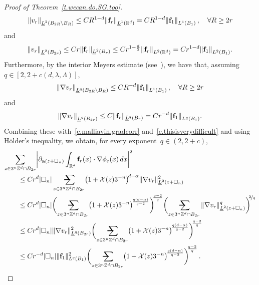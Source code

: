 \documentclass[11pt,twoside]{article} %
\makeatletter
\let\oldsquare\square %
\renewcommand{\square}{\oldsquare}
\numberwithin{equation}{section}
\theoremstyle{definition}
\let\originalleft\left
\let\originalright\right
\renewcommand{\left}{\mathopen{}\mathclose\bgroup\originalleft}
\renewcommand{\right}{\aftergroup\egroup\originalright}
\newcommand*{\Zd}{\ensuremath{\mathbb{Z}^d}}
\newcommand*{\Rd}{\ensuremath{\mathbb{R}^d}}
\newcommand{\f}{\mathbf{f}}
\renewcommand{\a}{\mathbf{a}}
\newcommand{\cu}{\square}
\newcommand{\X}{\mathcal{X}}
\newcommand{\avsum}{\mathop{\mathpalette\avsuminner\relax}\displaylimits}
\newcommand\avsuminner[2]{%
  {\sbox0{$\m@th#1\sum$}%
   \vphantom{\usebox0}%
   \ooalign{%
     \hidewidth
     \smash{\,\rule[.23em]{8.8pt}{1.1pt} \relax}%
     \hidewidth\cr
   ~$\m@th#1\sum$\cr
   }%
  }%
}
\makeatother
\begin{document}
\begin{proof}[{Proof of Theorem~\ref{t.wecan.do.SG.too}}]
\begin{equation*}
\left\| v_r \right\|_{\underline{L}^2(B_{2R}\setminus B_R )}
\leq 
CR^{1-d} \left\| \f_r \right\|_{\underline{L}^1(\Rd)} 
=
CR^{1-d} \left\| \f_1 \right\|_{L^1(B_1)} \,,
\quad \forall R\geq 2r
\end{equation*}
and
\begin{equation*}
\left\| v_r \right\|_{\underline{L}^2(B_{2r})}
\leq 
Cr  \| \f_r \|_{\underline{L}^2(B_r)}
\leq
Cr^{1-\frac d2}  \left\| \f_r \right\|_{L^2(\Rd)}
=
Cr^{1-d} \left\| \f_1 \right\|_{L^2(B_1)} .
\end{equation*}
Furthermore, by the interior Meyers estimate (see~\cite[Theorem C.1]{AKMBook}), we have that, assuming~$q \in [2, 2+c(d,\lambda,\Lambda)]$,  
\begin{equation}
\label{e.go.Meyersout}
\left\| \nabla v_r \right\|_{\underline{L}^q(B_{2R}\setminus B_R )}
\leq 
CR^{-d} \left\| \f_1 \right\|_{L^1(B_1)} \,,
\quad \forall R\geq 2r
\end{equation}
and
\begin{equation}
\label{e.go.Meyersin}
\left\| \nabla v_r \right\|_{\underline{L}^q(B_{4r})}
\leq 
C\| \f_r \|_{\underline{L}^q(B_r)}
=
C r^{-d} \left\| \f_1 \right\|_{L^q(B_1)} .
\end{equation}
Combining these with~\eqref{e.malliavin.gradcorr} and~\eqref{e.thisisverydifficult} and using H\"older's inequality, we obtain, for every exponent~$q\in (2,2+c)$, 
\begin{align*}
\lefteqn{ \sum_{z\in 3^n\Zd\cap B_{2r}} \left|  \partial_{\a(z+\cu_n)} \int_{\Rd} \f_r(x)\cdot \nabla \phi_e(x)\,dx
\right|^2
} \qquad & 
\notag \\ & 
\leq
C r^d |\cu_n| 
\avsum_{z\in 3^n\Zd\cap B_{2r}}
 \bigl(1+\X(z) 3^{-n} \bigr)^{\! d-\alpha}
\| \nabla v_r \|_{\underline{L}^2(z+\cu_n)}^2
\notag \\ & 
\leq 
Cr^d |\cu_n|
\biggl( \avsum_{z\in 3^n\Zd\cap B_{2r}}
 \bigl(1+\X(z) 3^{-n} \bigr)^{\! \frac{q(d-\alpha)}{q-2}}
\biggr)^{\!\!\frac{q-2}{q} }
\biggl( 
\avsum_{z\in 3^n\Zd\cap B_{2r}}
\| \nabla v_r \|_{\underline{L}^2(z+\cu_n)}^{q}
\biggr)^{\!\!\nicefrac 2q}
\notag \\ & 
\leq 
Cr^d |\cu_n| 
\| \nabla v_r \|_{\underline{L}^q(B_{2r})}^2 
\biggl( \avsum_{z\in 3^n\Zd\cap B_{2r}}
 \bigl(1+\X(z) 3^{-n} \bigr)^{\! \frac{q(d-\alpha)}{q-2}}
\biggr)^{\!\!\frac{q-2}{q} }
\notag \\ & 
\leq 
C r^{-d} |\cu_n| \| \f_1\|_{L^q(B_1)}^2
\biggl( \avsum_{z\in 3^n\Zd\cap B_{2r}}
 \bigl(1+\X(z) 3^{-n} \bigr)^{\! \frac{q(d-\alpha)}{q-2}}
\biggr)^{\!\!\frac{q-2}{q} }
\,.
\end{align*}

\end{proof}
\end{document}
